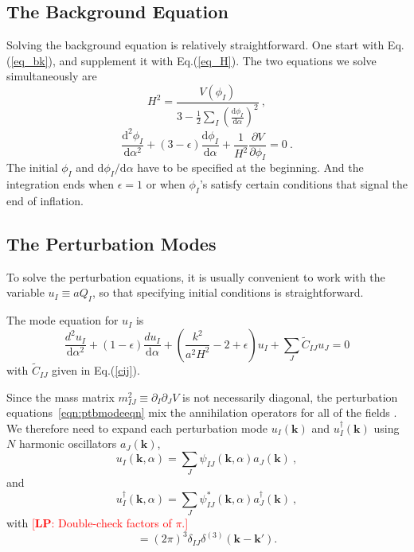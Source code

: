 \documentclass[11pt]{article}
\newcommand{\ud}{\mathrm{d}}
\newcommand{\pd}{\partial}
\def\bk{{\mathbf{k}}}
\def\tilC{{\tilde C}}
\newcommand{\lp}[1]{\textcolor{red}{[{\bf LP}: #1]}}
\begin{document}
\subsection{The Background Equation}

Solving the background equation is relatively straightforward. One start with Eq.(\ref{eq_bk}), and supplement it with Eq.(\ref{eq_H}). The two equations we solve simultaneously are 
\begin{equation}
H^2 = \frac{V(\phi_I)}{3 - \frac{1}{2}\sum_I \left(\frac{\ud \phi_I}{\ud \alpha}\right)^2} ~,
\end{equation}
\begin{equation}
\frac{\ud^2 \phi_I}{\ud \alpha^2 } + (3 -\epsilon) \frac{\ud \phi_I}{\ud \alpha} + \frac{1}{H^2}\frac{\pd V}{\pd \phi_I} = 0  ~.
\end{equation}
The initial $\phi_I$ and $\ud \phi_I/\ud \alpha$ have to be specified at the beginning. And the integration ends when $\epsilon = 1$ or when $\phi_I$'s satisfy certain conditions that signal the end of inflation. 

\subsection{The Perturbation Modes}

To solve the perturbation equations, it is usually convenient to work with the variable $u_I \equiv a Q_I$, so that specifying initial conditions is straightforward. 

The mode equation for $u_I$ is 
\begin{equation}
\frac{d^2 u_I}{\ud \alpha^2} + (1-\epsilon) \frac{d u_I}{\ud \alpha} + \left(\frac{k^2}{a^2H^2} - 2 + \epsilon \right) u_I + \sum_J \tilC_{IJ} u_J = 0
\label{eqn:ptbmodeeqn}
\end{equation}
with $\tilC_{IJ}$ given in Eq.(\ref{cij}).

Since the mass matrix $m^2_{IJ} \equiv \pd_I\pd_J V$ is not necessarily diagonal, the perturbation equations~\eqref{eqn:ptbmodeeqn} mix the annihilation operators for all of the fields \cite{Salopek:1988qh}. We therefore need to expand each perturbation mode $u_I(\bk)$ and $u_I^\dagger(\bk)$ using $N$ harmonic oscillators $a_J(\bk)$,
\begin{equation}
u_I(\bk, \alpha) = \sum_J \psi_{IJ}(\bk, \alpha) a_J(\bk) ~,
\end{equation}
and
\begin{equation}
u_I^\dagger(\bk, \alpha) = \sum_J \psi_{IJ}^*(\bk, \alpha) a_J^\dagger(\bk) ~,
\end{equation}
with \lp{Double-check factors of $\pi$.}
\begin{equation}
[ a_J(\bk), a^\dagger_I(\bk')] = (2\pi)^3 \delta_{IJ} \delta^{(3)}(\bk - \bk').
\end{equation}
\end{document}

